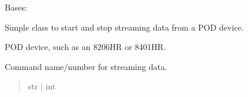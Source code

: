 \documentclass[letterpaper,10pt,english]{sphinxmanual}
\begin{document}
\begin{fulllineitems}
\label{\detokenize{PodApi.Stream:PodApi.Stream.DeviceValve.Valve}}
\pysigstartsignatures
{}
\pysigstopsignatures
\sphinxAtStartPar
Bases: 

\sphinxAtStartPar
Simple class to start and stop streaming data from a POD device.

\begin{fulllineitems}
\label{\detokenize{PodApi.Stream:PodApi.Stream.DeviceValve.Valve.podDevice}}
\pysigstartsignatures
{}
\pysigstopsignatures
\sphinxAtStartPar
POD device, such as an 8206\sphinxhyphen{}HR or 8401\sphinxhyphen{}HR.
\begin{quote}\begin{description}
\sphinxAtStartPar
{\hyperref[\detokenize{PodApi.Devices:PodApi.Devices.BasicPodProtocol.Pod}]{}}

\end{description}\end{quote}

\end{fulllineitems}


\begin{fulllineitems}
\label{\detokenize{PodApi.Stream:PodApi.Stream.DeviceValve.Valve.streamCmd}}
\pysigstartsignatures
{}
\pysigstopsignatures
\sphinxAtStartPar
Command name/number for streaming data.
\begin{quote}\begin{description}
\sphinxAtStartPar
str | int


\end{description}
\end{quote}
\end{fulllineitems}
\end{fulllineitems}
\end{document}
